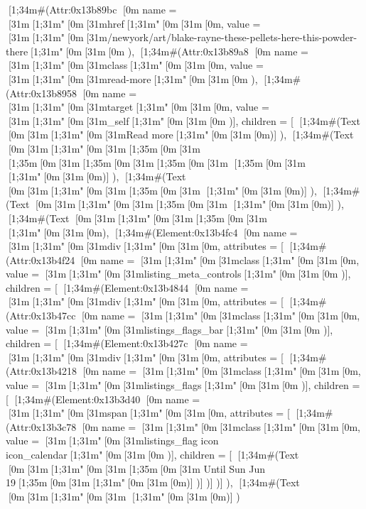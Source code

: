 {{{{{                    [1;34m#(Attr:0x13b89bc {[0m
                      name = [31m[1;31m"[0m[31mhref[1;31m"[0m[31m[0m,
                      value = [31m[1;31m"[0m[31m/newyork/art/blake-rayne-these-pellets-here-this-powder-there[1;31m"[0m[31m[0m
                      }),
                    [1;34m#(Attr:0x13b89a8 {[0m name = [31m[1;31m"[0m[31mclass[1;31m"[0m[31m[0m, value = [31m[1;31m"[0m[31mread-more[1;31m"[0m[31m[0m }),
                    [1;34m#(Attr:0x13b8958 {[0m name = [31m[1;31m"[0m[31mtarget[1;31m"[0m[31m[0m, value = [31m[1;31m"[0m[31m_self[1;31m"[0m[31m[0m })],
                  children = [ [1;34m#(Text [0m[31m[1;31m"[0m[31mRead more[1;31m"[0m[31m[0m)]
                  }),
                [1;34m#(Text [0m[31m[1;31m"[0m[31m[1;35m\n[0m[31m    [1;35m\t[0m[31m[1;35m\t[0m[31m[1;35m\t[0m[31m        [1;35m\t[0m[31m        [1;31m"[0m[31m[0m)]
              }),
            [1;34m#(Text [0m[31m[1;31m"[0m[31m[1;35m\n[0m[31m    [1;31m"[0m[31m[0m)]
          }),
        [1;34m#(Text [0m[31m[1;31m"[0m[31m[1;35m\n[0m[31m    [1;31m"[0m[31m[0m)]
      }),
    [1;34m#(Text [0m[31m[1;31m"[0m[31m[1;35m\n[0m[31m            [1;31m"[0m[31m[0m),
    [1;34m#(Element:0x13b4fc4 {[0m
      name = [31m[1;31m"[0m[31mdiv[1;31m"[0m[31m[0m,
      attributes = [ [1;34m#(Attr:0x13b4f24 {[0m name = [31m[1;31m"[0m[31mclass[1;31m"[0m[31m[0m, value = [31m[1;31m"[0m[31mlisting_meta_controls[1;31m"[0m[31m[0m })],
      children = [
        [1;34m#(Element:0x13b4844 {[0m
          name = [31m[1;31m"[0m[31mdiv[1;31m"[0m[31m[0m,
          attributes = [ [1;34m#(Attr:0x13b47cc {[0m name = [31m[1;31m"[0m[31mclass[1;31m"[0m[31m[0m, value = [31m[1;31m"[0m[31mlistings_flags_bar[1;31m"[0m[31m[0m })],
          children = [
            [1;34m#(Element:0x13b427c {[0m
              name = [31m[1;31m"[0m[31mdiv[1;31m"[0m[31m[0m,
              attributes = [ [1;34m#(Attr:0x13b4218 {[0m name = [31m[1;31m"[0m[31mclass[1;31m"[0m[31m[0m, value = [31m[1;31m"[0m[31mlistings_flags[1;31m"[0m[31m[0m })],
              children = [
                [1;34m#(Element:0x13b3d40 {[0m
                  name = [31m[1;31m"[0m[31mspan[1;31m"[0m[31m[0m,
                  attributes = [
                    [1;34m#(Attr:0x13b3c78 {[0m name = [31m[1;31m"[0m[31mclass[1;31m"[0m[31m[0m, value = [31m[1;31m"[0m[31mlistings_flag icon icon_calendar[1;31m"[0m[31m[0m })],
                  children = [ [1;34m#(Text [0m[31m[1;31m"[0m[31m[1;35m\n[0m[31m    Until Sun Jun 19[1;35m\n[0m[31m[1;31m"[0m[31m[0m)]
                  })]
              })]
          })]
      }),
    [1;34m#(Text [0m[31m[1;31m"[0m[31m    [1;31m"[0m[31m[0m)]
  })
